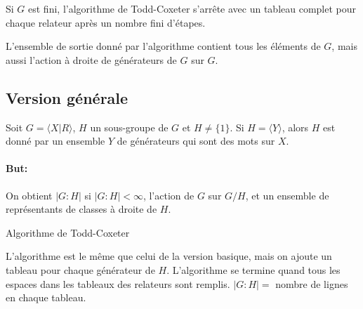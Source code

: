      


     \begin{theo}
       Si $G$ est fini, l'algorithme de Todd-Coxeter s'arrête avec un tableau complet pour chaque relateur
       après un nombre fini d'étapes.

       L'ensemble de sortie donné par l'algorithme contient tous les éléments de $G$, mais aussi l'action à
       droite de générateurs de $G$ sur $G$.
     \end{theo}


     \subsection{Version générale}

       Soit $G = \langle X | R \rangle$, $H$ un sous-groupe de $G$ et $H \neq \{1\}$. Si $H = \langle Y
       \rangle$, alors $H$ est donné par un ensemble $Y$ de générateurs qui sont des mots sur $X$.

       \paragraph{But:} On obtient $|G:H|$ si $|G:H| < \infty$, l'action de $G$ sur $G/H$, et un ensemble de
       représentants de classes à droite de $H$.

       
       \begin{algorithm}
       \caption{Algorithme de Todd-Coxeter}
       \label{alg:todd-coxeter}
       \begin{algorithmic}
         \State L'algorithme est le même que celui de la version basique, mais on ajoute un tableau pour chaque générateur de $H$.
         \State L'algorithme se termine quand tous les espaces dans les tableaux des relateurs sont remplis.
         \State $|G:H| = $ nombre de lignes en chaque tableau.
       \end{algorithmic} 
     \end{algorithm}

